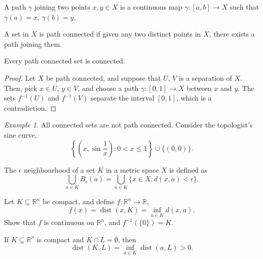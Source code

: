\documentclass[11pt]{article}
\newcommand{\R}{\mathbb{R}}
\theoremstyle{definition}
\theoremstyle{remark}
\newtheorem*{example}{Example}
\numberwithin{equation}{section}
\begin{document}
    \begin{definition}
        A path $\gamma$ joining two points $x, y \in X$ is a continuous map
        $\gamma\colon [a, b] \to X$ such that $\gamma(a) = x$, $\gamma(b) = y$.
    \end{definition}

    \begin{definition}
        A set in $X$ is path connected if given any two distinct points in $X$, there
        exists a path joining them.
    \end{definition}

    \begin{lemma}
        Every path connected set is connected.
    \end{lemma}
    \begin{proof}
        Let $X$ be path connected, and suppose that $U$, $V$ is a separation of $X$.
        Then, pick $x \in U$, $y \in V$, and choose a path $\gamma\colon [0, 1] \to
        X$ between $x$ and $y$. The sets $f^{-1}(U)$ and $f^{-1}(V)$ separate the
        interval $[0, 1]$, which is a contradiction.
    \end{proof}
    \begin{example}
        All connected sets are not path connected. Consider the topologist's sine
        curve, \[
            \left\{\left(x, \sin{\frac{1}{x}}\right): 0 < x \leq 1\right\} \cup \{(0,
            0)\}.
        \] 
    \end{example}


    \begin{definition}
        The $\epsilon$ neighbourhood of a set $K$ in a metric space $X$ is defined as \[
             \bigcup_{a \in K} B_\epsilon(a) = \bigcup_{a \in K} \{x \in X: d(x, a) <
             \epsilon\}.
        \] 
    \end{definition}

    \begin{exercise}
        Let $K \subseteq \R^n$ be compact, and define $f\colon \R^n \to \R$, \[
            f(x) = \operatorname{dist}(x, K) = \inf_{a \in K} d(x, a).
        \] Show that $f$ is continuous on $\R^n$, and $f^{-1}(\{0\}) = K$.
    \end{exercise}

    \begin{exercise}
        If $K \subseteq \R^n$ is compact and $K \cap L = \emptyset$, then \[
            \operatorname{dist}(K, L) = \inf_{a \in K} \operatorname{dist}(a, L) > 0.
        \] 
    \end{exercise}
\end{document}
